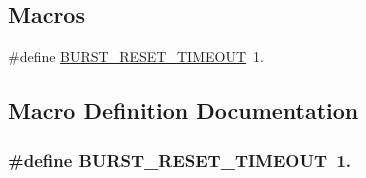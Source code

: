 \subsection*{Macros}
\begin{DoxyCompactItemize}
\item 
\#define \hyperlink{pie-queue-disc_8h_a80d6724f928c4bd56c16a35b25afe0a1}{B\+U\+R\+S\+T\+\_\+\+R\+E\+S\+E\+T\+\_\+\+T\+I\+M\+E\+O\+UT}~1.
\end{DoxyCompactItemize}


\subsection{Macro Definition Documentation}
\subsubsection[{\texorpdfstring{B\+U\+R\+S\+T\+\_\+\+R\+E\+S\+E\+T\+\_\+\+T\+I\+M\+E\+O\+UT}{BURST_RESET_TIMEOUT}}]{\setlength{\rightskip}{0pt plus 5cm}\#define B\+U\+R\+S\+T\+\_\+\+R\+E\+S\+E\+T\+\_\+\+T\+I\+M\+E\+O\+UT~1.}\hypertarget{pie-queue-disc_8h_a80d6724f928c4bd56c16a35b25afe0a1}{}\label{pie-queue-disc_8h_a80d6724f928c4bd56c16a35b25afe0a1}

